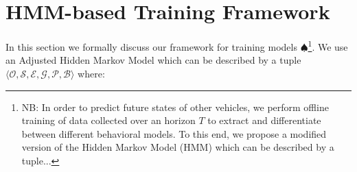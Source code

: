 \documentclass[letterpaper, 10 pt, conference]{ieeeconf}  %
\newcommand\NB[1]{$\spadesuit$\footnote{NB: #1}}
\begin{document}

\section{HMM-based Training Framework} \label{sec:fmwk}
In this section we formally discuss our framework for training models \NB{In order to predict future states of other vehicles, we perform offline training of data collected over an horizon $T$ to extract and differentiate between different behavioral models. To this end, we propose a modified version of the Hidden Markov Model (HMM) \cite{woohmm} which can be described by a tuple... }. We use an Adjusted Hidden Markov Model which can be described by a tuple $\langle \mathcal{O},\mathcal{S},\mathcal{E},\mathcal{G},\mathcal{P},\mathcal{B} \rangle$  where:
\end{document}
